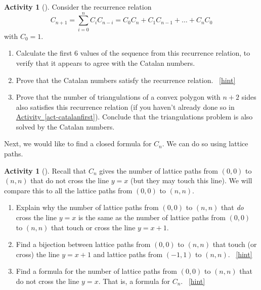 \documentclass[10pt,]{book}
\theoremstyle{plain}
\theoremstyle{definition}
\theoremstyle{definition}
\theoremstyle{definition}
\newtheorem{activity}[project]{Activity}
\numberwithin{equation}{chapter}
\begin{document}
\begin{activity}[]\label{activity-174}
\hypertarget{p-1023}{}%
Consider the recurrence relation%
\begin{equation*}
C_{n + 1} = \sum_{i = 0}^n C_iC_{n-i} = C_{0}C_{n} + C_{1}C_{n - 1} + \ldots + C_{n}C_{0}
\end{equation*}
with \(C_0 = 1\).%
\begin{enumerate}[font=\bfseries,label=(\alph*),ref=\alph*]
\item\label{task-191} \hypertarget{p-1024}{}%
Calculate the first 6 values of the sequence from this recurrence relation, to verify that it appears to agree with the Catalan numbers.%
\item\label{task-192} \hypertarget{p-1025}{}%
Prove that the Catalan numbers satisfy the recurrence relation.%
~\hfill{\tiny\hyperlink{a-181.b}{[hint]}\hypertarget{q-181.b}{}}\item\label{task-193} \hypertarget{p-1027}{}%
Prove that the number of triangulations of a convex polygon with \(n+2\) sides also satisfies this recurrence relation (if you haven't already done so in \hyperref[act-catalanfirst]{Activity~\ref{act-catalanfirst}}).  Conclude that the triangulations problem is also solved by the Catalan numbers.%
\end{enumerate}
\end{activity}
\hypertarget{p-1028}{}%
Next, we would like to find a closed formula for \(C_n\).  We can do so using lattice paths.%
\begin{activity}[]\label{activity-175}
\hypertarget{p-1029}{}%
Recall that \(C_n\) gives the number of lattice paths from \((0,0)\) to \((n,n)\) that do not cross the line \(y = x\) (but they may touch this line).  We will compare this to all the lattice paths from \((0,0)\) to \((n,n)\).%
\begin{enumerate}[font=\bfseries,label=(\alph*),ref=\alph*]
\item\label{task-194} \hypertarget{p-1030}{}%
Explain why the number of lattice paths from \((0,0)\) to \((n,n)\) that \emph{do} cross the line \(y = x\) is the same as the number of lattice paths from \((0,0)\) to \((n,n)\) that touch or cross the line \(y = x + 1\).%
\item\label{task-195} \hypertarget{p-1032}{}%
Find a bijection between lattice paths from \((0,0)\) to \((n,n)\) that touch (or cross) the line \(y=x+1\) and lattice paths from \((-1,1)\) to \((n,n)\).%
~\hfill{\tiny\hyperlink{a-182.b}{[hint]}\hypertarget{q-182.b}{}}\item\label{task-196} \hypertarget{p-1035}{}%
Find a formula for the number of lattice paths from \((0,0)\) to \((n,n)\) that do not cross the line \(y=x\). That is, a formula for \(C_n\).%
~\hfill{\tiny\hyperlink{a-182.c}{[hint]}\hypertarget{q-182.c}{}}\end{enumerate}
\end{activity}
\end{document}
